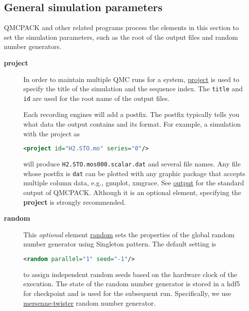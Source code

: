 \subsection{General simulation parameters}

QMCPACK and other related programs process the elements in this section to set
the simulation parameters, such as the root of the output files and random
number generators. 

\begin{description}
\item[\textbf{project}{}]\label{project.sec}
In order to maintain multiple QMC runs for a system,
\hyperlink{project.element}{project} is used to specify the title of the
simulation and the sequence index. The \texttt{title} and \texttt{id} are used
for the root name of the output files. 
 
Each recording engines will add a postfix. The postfix typically tells you what
data the output contains and its format.  For example, a simulation with the
project as
\begin{lstlisting}[language=XML,emph={project},emphstyle=\bfseries\color{blue}]
  <project id="H2.STO.mo" series="0"/>
\end{lstlisting} 
will produce \nolinkurl{H2.STO.mos000.scalar.dat} and several file names. Any
file whose postfix is \nolinkurl{dat} can be plotted with any graphic package
that accepts multiple column data, e.g., gnuplot, xmgrace. See
\hyperlink{output.sec}{output} for the standard output of QMCPACK.  Although it
is an optional element, specifying the \textbf{project} is strongly
recommended.


\item[\textbf{random}{}]
This \emph{optional} element \hyperlink{random.element}{random} sets the
properties of the global random number generator using Singleton pattern. The
default setting is
  
\begin{lstlisting}[language=XML,emph={random},emphstyle=\bfseries\color{blue}]
  <random parallel="1" seed="-1"/>
\end{lstlisting}
 to assign independent random seeds based on the hardware clock of the
 execution. The state of the random number generator is stored in a hdf5 for
 checkpoint and is used for the subsequent run.  Specifically, we use
 \href{http://www.boost.org/boost/random/mersenne_twister.hpp}{
 mersenne-{}twister} random number generator.
\end{description}
   

